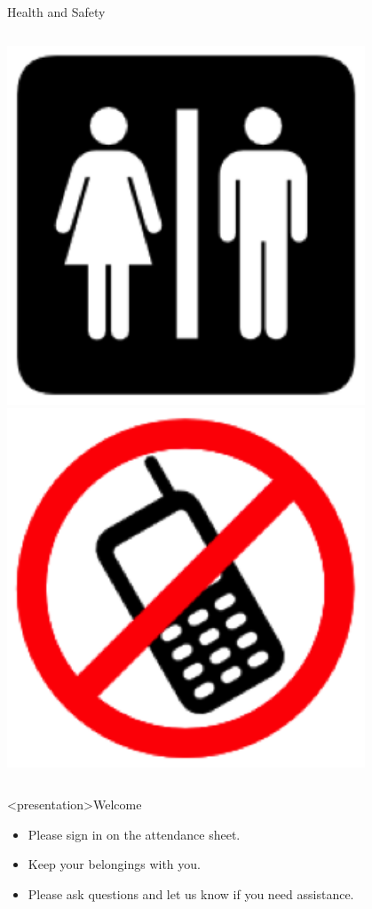 \documentclass[handout]{beamer} %
\begin{document}
\begin{frame}{Health and Safety}
\begin{columns}[c]
\begin{column}{0.33\textwidth}
\begin{center}
\includegraphics[width=0.8\textwidth,height=0.5\textheight,keepaspectratio]{imgs/health-safety-3.png}\\
\includegraphics[width=0.8\textwidth,height=0.5\textheight,keepaspectratio]{imgs/health-safety-6.png}
\end{center}
\end{column}
\end{columns}
\end{frame}

\begin{frame}<presentation>{Welcome}
\begin{itemize}
\item{Please sign in on the {\color{red}attendance sheet}.}
\item{Keep your belongings with you.}
\item\alert{Please ask questions and let us know if you need assistance.}
\end{itemize}
\end{frame}
\end{document}
